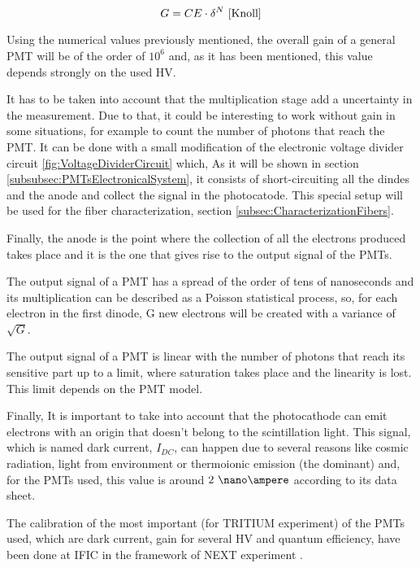 \begin{itemize}
\begin{equation}
G = CE\cdot{} \delta^N~\cite{Knoll}
\label{eq:PMTGain}
\end{equation}

Using the numerical values previously mentioned, the overall gain of a general PMT will be of the order of $10^6$ and, as it has been mentioned, this value depends strongly on the used HV.

It has to be taken into account that the multiplication stage add a uncertainty in the measurement. Due to that, it could be interesting to work without gain in some situations, for example to count the number of photons that reach the PMT. It can be done with a small modification of the electronic voltage divider circuit \ref{fig:VoltageDividerCircuit} which, As it will be shown in section \ref{subsubsec:PMTsElectronicalSystem}, it consists of short-circuiting all the dindes and the anode and collect the signal in the photocatode. This special setup will be used for the fiber characterization, section \ref{subsec:CharacterizationFibers}.

Finally, the anode is the point where the collection of all the electrons produced takes place and it is the one that gives rise to the output signal of the PMTs.

\end{itemize}

The output signal of a PMT has a spread of the order of tens of nanoseconds and its multiplication can be described as a Poisson statistical process, so, for each electron in the first dinode, G new electrons will be created with a variance of $\sqrt{G}$.

The output signal of a PMT is linear with the number of photons that reach its sensitive part up to a limit, where saturation takes place and the linearity is lost. This limit depends on the PMT model.

Finally, It is important to take into account that the photocathode can emit electrons with an origin that doesn't belong to the scintillation light. This signal, which is named dark current, $I_{DC}$, can  happen due to several reasons like cosmic radiation, light from environment or thermoionic emission (the dominant) and, for the PMTs used, this value is around $2~\nano\ampere$ according to its data sheet.

The calibration of the most important (for TRITIUM experiment) of the PMTs used, which are dark current, gain for several HV and quantum efficiency,  have been done at IFIC in the framework of NEXT experiment \cite{CalibrationPMTsNEXT}. 